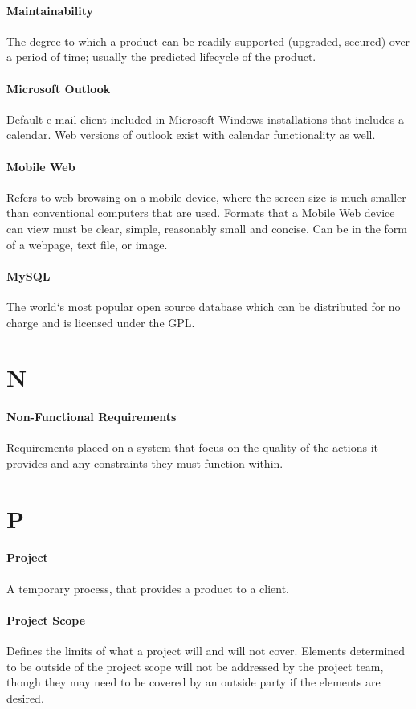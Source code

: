 \documentclass[letterpaper,12pt]{report}
\begin{document}
\paragraph{Maintainability} The degree to which a product can be readily supported (upgraded, secured) over a period of time; usually the predicted lifecycle of the product.
\paragraph{Microsoft Outlook} Default e-mail client included in Microsoft Windows installations that includes a calendar. Web versions of outlook exist with calendar functionality as well.
\paragraph{Mobile Web} Refers to web browsing on a mobile device, where the screen size is much smaller than conventional computers that are used. Formats that a Mobile Web device can view must be clear, simple, reasonably small and concise. Can be in the form of a webpage, text file, or image.
\paragraph{MySQL} The world`s most popular open source database which can be distributed for no charge and is licensed under the GPL.
\section*{N}
\paragraph{Non-Functional Requirements} Requirements placed on a system that focus on the quality of the actions it provides and any constraints they must function within.
\section*{P}
\paragraph{Project} A temporary process, that provides a product to a client.
\paragraph{Project Scope} Defines the limits of what a project will and will not cover.  Elements determined to be outside of the project scope will not be addressed by the project team, though they may need to be covered by an outside party if the elements are desired.
\end{document}
